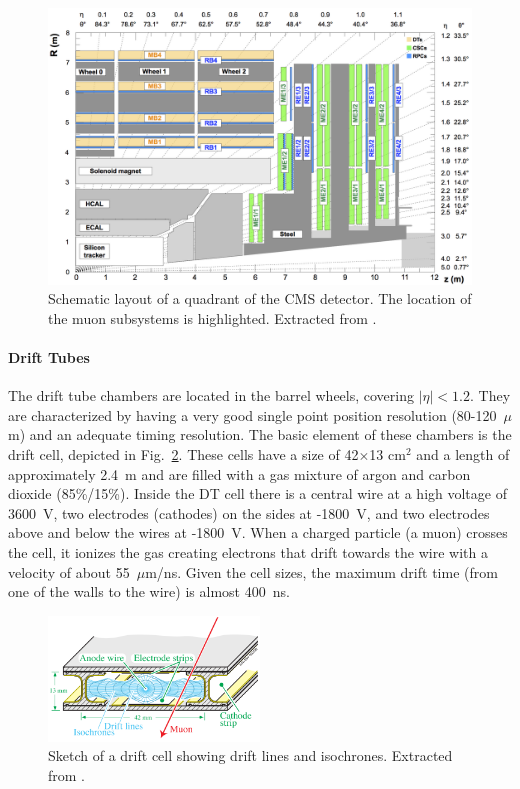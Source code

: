 \documentclass[../main.tex]{subfiles}
\begin{document}
\begin{figure}
\begin{center}
\includegraphics[width=\textwidth]{Images/muonsystem}
\end{center}
\caption{Schematic layout of a quadrant of the CMS detector. The location of the muon subsystems is highlighted. Extracted from \cite{intro:id:muon_13tev}.}
\label{intro:fig:muon}
\end{figure}

\paragraph{Drift Tubes}
The drift tube chambers are located in the barrel wheels, covering $|\eta|<1.2$. They are characterized by having a very good single point position resolution (80-120~$\mu$m) and an adequate timing resolution. The basic element of these chambers is the drift cell, depicted in Fig.~\ref{intro:fig:dtcell}. These cells have a size of 42$\times$13 cm${}^2$ and a length of approximately 2.4~m and are filled with a gas mixture of argon and carbon dioxide (85\%/15\%). Inside the DT cell there is a central wire at a high voltage of 3600~V, two electrodes (cathodes) on the sides at -1800~V, and two electrodes above and below the wires at -1800~V. When a charged particle (a muon) crosses the cell, it ionizes the gas creating electrons that drift towards the wire with a velocity of about 55~$\mu$m/ns. Given the cell sizes, the maximum drift time (from one of the walls to the wire) is almost 400~ns.

\begin{figure}
\begin{center}
\includegraphics[width=0.5\textwidth]{Images/Celda.png}
\end{center}
\caption{Sketch of a drift cell showing drift lines and isochrones. Extracted from \cite{intro:exp:cms}.}
\label{intro:fig:dtcell}
\end{figure}
\end{document}
